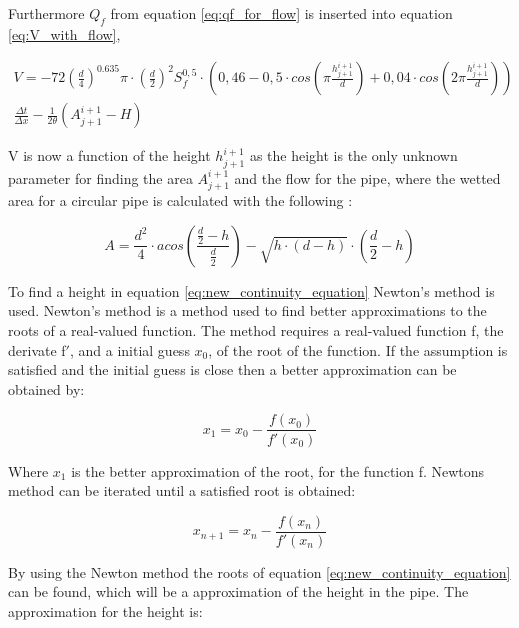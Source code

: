 Furthermore $Q_f$ from equation \ref{eq:qf_for_flow} is inserted into equation \ref{eq:V_with_flow},

\begin{multline}\label{eq:new_continuity_equation}
    V = -72\left(\frac{d}{4}\right)^{0.635}\pi\cdot\left(\frac{d}{2}\right)^2S_f^{0,5}\cdot \left(0,46-0,5\cdot cos\left(\pi \frac{h_{j+1}^{i+1}}{d}\right)+ 0,04\cdot cos\left(2\pi\frac{h_{j+1}^{i+1}}{d}\right)\right)\\ \frac{\Delta t}{\Delta x}-\frac{1}{2\theta}\left(A_{j+1}^{i+1}-H\right)
\end{multline}

V is now a function of the height $h_{j+1}^{i+1}$ as the height is the only unknown parameter for finding the area $A_{j+1}^{i+1}$ and the flow for the pipe, where the wetted area for a circular pipe is calculated with the following \cite{ikke_stationear}:

\begin{equation}\label{eq:calc_area_open_channel}
    A = \frac {d^2}{4} \cdot acos \left(\frac{\frac{d}{2}-h}{\frac{d}{2}}\right)-\sqrt{h\cdot (d-h)}\cdot  \left(\frac{d}{2}-h\right)
\end{equation}


To find a height in equation \ref{eq:new_continuity_equation} Newton's method is used. Newton's method is a method used to find better approximations to the roots of a real-valued function. The method requires a real-valued function f, the derivate f$'$, and a initial guess $x_0$, of the root of the function. If the assumption is satisfied and the initial guess is close then a better approximation can be obtained by:

\begin{equation}\label{eq:newtons_method_standard}
     x_1 = x_0 - \frac{f(x_0)}{f'(x_0)}
\end{equation} 

Where $x_1$ is the better approximation of the root, for the function f. Newtons method can be iterated until a satisfied root is obtained:


\begin{equation}\label{eq:newtons_method_standard}
     x_{n+1} = x_n - \frac{f(x_n)}{f'(x_n)}
\end{equation} 

By using the Newton method the roots of equation \ref{eq:new_continuity_equation} can be found, which will be a approximation of the height in the pipe. The approximation for the height is:

